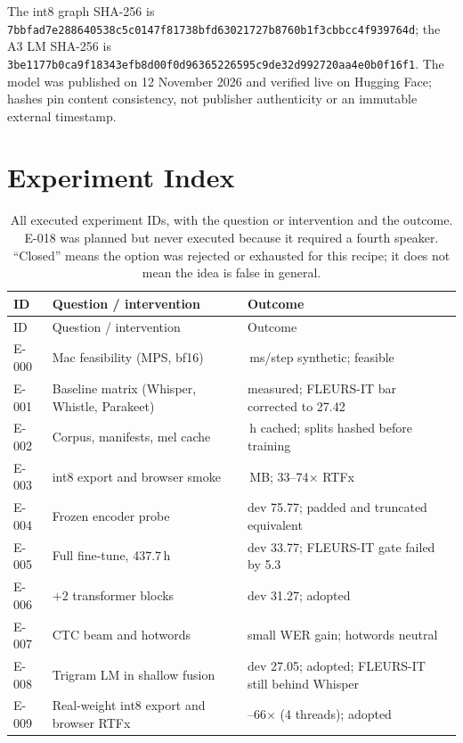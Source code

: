 \documentclass{article}
\begin{document}
The int8 graph SHA-256 is
\texttt{7bbfad7e288640538c5c0147f81738bfd63021727b8760b1f3cbbcc4f939764d}; the A3 LM SHA-256 is
\texttt{3be1177b0ca9f18343efb8d00f0d96365226595c9de32d992720aa4e0b0f16f1}. The model was published
on 12 November 2026 and verified live on Hugging Face; hashes pin content consistency, not
publisher authenticity or an immutable external timestamp.

\section{Experiment Index}
\label{app:experiments}

\begin{longtable}{@{}p{1.05cm}>{\raggedright\arraybackslash}p{5.0cm}>{\raggedright\arraybackslash}p{8.0cm}@{}}
\caption{All executed experiment IDs, with the question or intervention and the outcome. E-018 was
planned but never executed because it required a fourth speaker. ``Closed'' means the option was
rejected or exhausted for this recipe; it does not mean the idea is false in general.}
\label{tab:experiments} \\
\toprule
ID & Question / intervention & Outcome \\
\midrule
\endfirsthead
\toprule
ID & Question / intervention & Outcome \\
\midrule
\endhead
\bottomrule
\endfoot
E-000 & Mac feasibility (MPS, bf16) & 394\,ms/step synthetic; feasible \\
E-001 & Baseline matrix (Whisper, Whistle, Parakeet) & measured; FLEURS-IT bar corrected to 27.42 \\
E-002 & Corpus, manifests, mel cache & 509.8\,h cached; splits hashed before training \\
E-003 & int8 export and browser smoke & 8.32\,MB; 33--74$\times$ RTFx \\
E-004 & Frozen encoder probe & dev 75.77; padded and truncated equivalent \\
E-005 & Full fine-tune, 437.7\,h & dev 33.77; FLEURS-IT gate failed by 5.3 \\
E-006 & $+2$ transformer blocks & dev 31.27; adopted \\
E-007 & CTC beam and hotwords & small WER gain; hotwords neutral \\
E-008 & Trigram LM in shallow fusion & dev 27.05; adopted; FLEURS-IT still behind Whisper \\
E-009 & Real-weight int8 export and browser RTFx & 54--66$\times$ (4 threads); adopted \\

\end{longtable}
\end{document}
